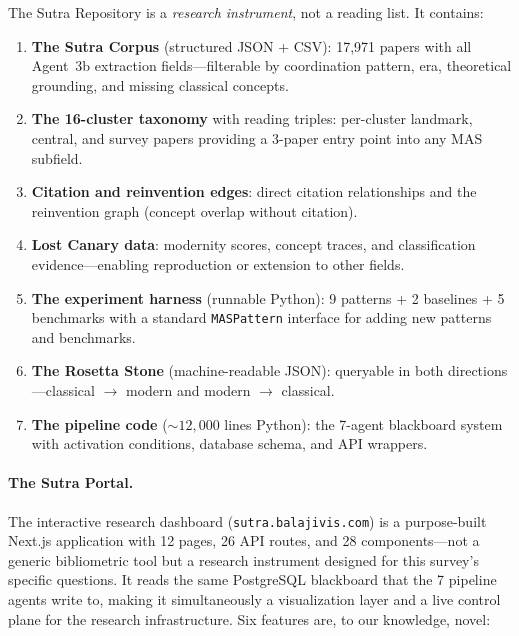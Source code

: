 \documentclass{article}
\begin{document}
The Sutra Repository is a \emph{research instrument}, not a reading list. It contains:
\begin{enumerate}[nosep]
  \item \textbf{The Sutra Corpus} (structured JSON + CSV): 17,971 papers with all
    Agent~3b extraction fields---filterable by coordination pattern, era, theoretical
    grounding, and missing classical concepts.
  \item \textbf{The 16-cluster taxonomy} with reading triples: per-cluster landmark,
    central, and survey papers providing a 3-paper entry point into any MAS subfield.
  \item \textbf{Citation and reinvention edges}: direct citation relationships and
    the reinvention graph (concept overlap without citation).
  \item \textbf{Lost Canary data}: modernity scores, concept traces, and
    classification evidence---enabling reproduction or extension to other fields.
  \item \textbf{The experiment harness} (runnable Python): 9 patterns + 2 baselines
    + 5 benchmarks with a standard \texttt{MASPattern} interface for adding new
    patterns and benchmarks.
  \item \textbf{The Rosetta Stone} (machine-readable JSON): queryable in both
    directions---classical $\to$ modern and modern $\to$ classical.
  \item \textbf{The pipeline code} (${\sim}12{,}000$ lines Python): the 7-agent
    blackboard system with activation conditions, database schema, and API wrappers.
\end{enumerate}

\paragraph{The Sutra Portal.}
The interactive research dashboard (\texttt{sutra.balajivis.com}) is a purpose-built
Next.js application with 12 pages, 26 API routes, and 28 components---not a generic
bibliometric tool but a research instrument designed for this survey's specific
questions. It reads the same PostgreSQL blackboard that the 7 pipeline agents write
to, making it simultaneously a visualization layer and a live control plane for the
research infrastructure. Six features are, to our knowledge, novel:
\end{document}

